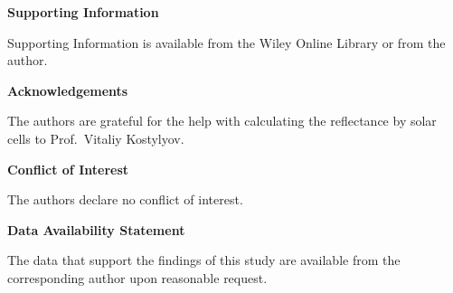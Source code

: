 \documentclass{WileyMSP-template}
\begin{document}



\medskip
\textbf{Supporting Information} \par %
Supporting Information is available from the Wiley Online Library or from the author.



\medskip
\textbf{Acknowledgements} \par %
The authors are grateful for the help with calculating the reflectance by solar cells to Prof.~Vitaliy Kostylyov.

\medskip
\textbf{Conflict of Interest}\par
The authors declare no conflict of interest.

\medskip
\textbf{Data Availability Statement}\par
The data that support the findings of this study are available from the corresponding author upon reasonable request.
\medskip







\end{document}
